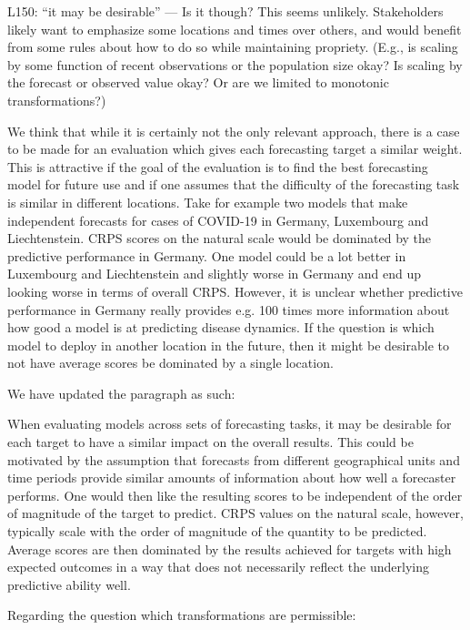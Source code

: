 \documentclass{article}
\newcommand{\black}{\color{black}}
\newcommand{\blue}{\color{blue}}
\newcommand{\indented}{\setlength{\leftskip}{1cm}}
\newcommand{\notindented}{\setlength{\leftskip}{0cm}}
\begin{document}
\notindented


\blue
L150: “it may be desirable” — Is it though? This seems unlikely. Stakeholders likely want to emphasize some locations and times over others, and would benefit from some rules about how to do so while maintaining propriety. (E.g., is scaling by some function of recent observations or the population size okay? Is scaling by the forecast or observed value okay? Or are we limited to monotonic transformations?)

\black
We think that while it is certainly not the only relevant approach, there is a case to be made for an evaluation which gives each forecasting target a similar weight. This is attractive if the goal of the evaluation is to find the best forecasting model for future use and if one assumes that the difficulty of the forecasting task is similar in different locations. Take for example two models that make independent forecasts for cases of COVID-19 in Germany, Luxembourg and Liechtenstein. CRPS scores on the natural scale would be dominated by the predictive performance in Germany. One model could be a lot better in Luxembourg and Liechtenstein and slightly worse in Germany and end up looking worse in terms of overall CRPS. However, it is unclear whether predictive performance in Germany really provides e.g. 100 times more information about how good a model is at predicting disease dynamics. If the question is which model to deploy in another location in the future, then it might be desirable to not have average scores be dominated by a single location. 

We have updated the paragraph as such: 

\indented
When evaluating models across sets of forecasting tasks, it may be desirable for each target to have a similar impact on the overall results. This could be motivated by the assumption that forecasts from different geographical units and time periods provide similar amounts of information about how well a forecaster performs. One would then like the resulting scores to be independent of the order of magnitude of the target to predict. CRPS values on the natural scale, however, typically scale with the order of magnitude of the quantity to be predicted. Average scores are then dominated by the results achieved for targets with high expected outcomes in a way that does not necessarily reflect the underlying predictive ability well.

\notindented

Regarding the question which transformations are permissible: 
\end{document}
